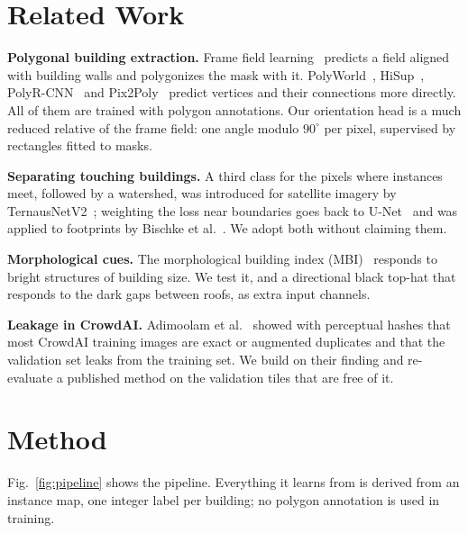 \documentclass[conference]{IEEEtran}
\begin{document}
\section{Related Work}
\textbf{Polygonal building extraction.} Frame field learning~\cite{girard2021ffl} predicts a field aligned with building
walls and polygonizes the mask with it. PolyWorld~\cite{zorzi2022polyworld}, HiSup~\cite{xu2023hisup},
PolyR-CNN~\cite{jiao2024polyrcnn} and Pix2Poly~\cite{adimoolam2025pix2poly} predict vertices and their connections more
directly. All of them are trained with polygon annotations. Our orientation head is a much reduced relative of the frame
field: one angle modulo $90^\circ$ per pixel, supervised by rectangles fitted to masks.

\textbf{Separating touching buildings.} A third class for the pixels where instances meet, followed by a watershed, was
introduced for satellite imagery by TernausNetV2~\cite{iglovikov2018ternausv2}; weighting the loss near
boundaries goes back to U-Net~\cite{ronneberger2015unet} and was applied to footprints by Bischke et
al.~\cite{bischke2019multitask}. We adopt both without claiming them.

\textbf{Morphological cues.} The morphological building index (MBI)~\cite{huang2011mbi} responds to bright structures of
building size. We test it, and a directional black top-hat that responds to the dark gaps between roofs, as extra input
channels.

\textbf{Leakage in CrowdAI.} Adimoolam et al.~\cite{adimoolam2023leakage} showed with perceptual hashes that most
CrowdAI training images are exact or augmented duplicates and that the validation set leaks from the training set. We
build on their finding and re-evaluate a published method on the validation tiles that are free of it.

\section{Method}
\label{sec:method}
Fig.~\ref{fig:pipeline} shows the pipeline. Everything it learns from is derived from an instance map, one integer label
per building; no polygon annotation is used in training.
\end{document}
